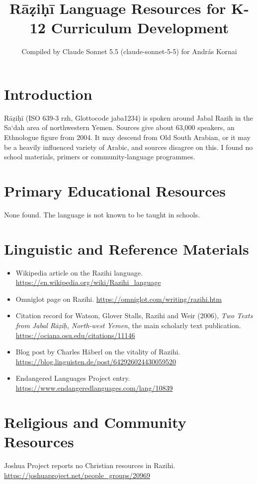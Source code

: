 \documentclass[12pt]{article}
\title{R\=a\d zi\d h\=i Language Resources for K-12 Curriculum Development}
\author{Compiled by Claude Sonnet 5.5 (claude-sonnet-5-5) for Andr\'as Kornai}
\date{}
\begin{document}
\maketitle

\section{Introduction}
R\=a\d zi\d h\=i (ISO 639-3 rzh, Glottocode jaba1234) is spoken around Jabal Razih in the Sa\textquoteleft dah area of northwestern Yemen. Sources give about 63,000 speakers, an Ethnologue figure from 2004. It may descend from Old South Arabian, or it may be a heavily influenced variety of Arabic, and sources disagree on this. I found no school materials, primers or community-language programmes.

\section{Primary Educational Resources}
None found. The language is not known to be taught in schools.

\section{Linguistic and Reference Materials}
\begin{itemize}
\item Wikipedia article on the Razihi language. \url{https://en.wikipedia.org/wiki/Razihi_language}
\item Omniglot page on Razihi. \url{https://omniglot.com/writing/razihi.htm}
\item Citation record for Watson, Glover Stalls, Razihi and Weir (2006), \emph{Two Texts from Jabal R\=a\d zi\d h, North-west Yemen}, the main scholarly text publication. \url{https://ociana.osu.edu/citations/11146}
\item Blog post by Charles H\"aberl on the vitality of Razihi. \url{https://blog.linguisten.de/post/642926024430059520}
\item Endangered Languages Project entry. \url{https://www.endangeredlanguages.com/lang/10839}
\end{itemize}

\section{Religious and Community Resources}
Joshua Project reports no Christian resources in Razihi. \url{https://joshuaproject.net/people_groups/20969}
\end{document}
